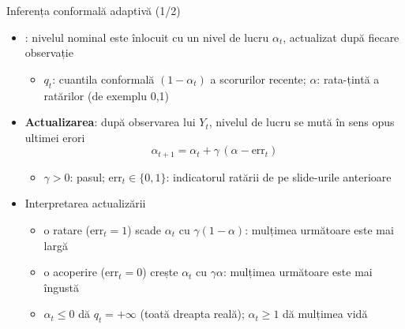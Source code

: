 \begin{frame}{Inferența conformală adaptivă (1/2)}
\itemsize{\small}
\begin{itemize}
    \item {}: nivelul nominal este înlocuit cu un nivel de lucru $\alpha_t$, actualizat după fiecare observație
    \begin{itemize}
        \item $q_t$: cuantila conformală $(1 - \alpha_t)$ a scorurilor recente; $\alpha$: rata-țintă a ratărilor (de exemplu 0,1)
    \end{itemize}
    \item \textbf{Actualizarea}: după observarea lui $Y_t$, nivelul de lucru se mută în sens opus ultimei erori \[ \alpha_{t+1} = \alpha_t + \gamma\,(\alpha - \mathrm{err}_t) \]
    \begin{itemize}
        \item $\gamma > 0$: pasul; $\mathrm{err}_t \in \{0, 1\}$: indicatorul ratării de pe slide-urile anterioare
    \end{itemize}
    \item Interpretarea actualizării
    \begin{itemize}
        \item o ratare ($\mathrm{err}_t = 1$) scade $\alpha_t$ cu $\gamma(1 - \alpha)$: mulțimea următoare este mai largă
        \item o acoperire ($\mathrm{err}_t = 0$) crește $\alpha_t$ cu $\gamma\alpha$: mulțimea următoare este mai îngustă
        \item $\alpha_t \le 0$ dă $q_t = +\infty$ (toată dreapta reală); $\alpha_t \ge 1$ dă mulțimea vidă
    \end{itemize}
\end{itemize}
\end{frame}


